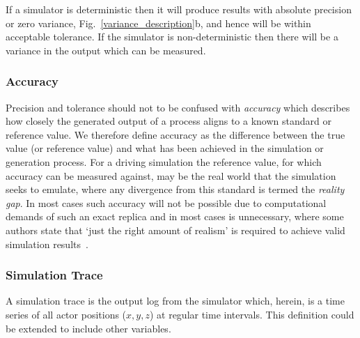 \documentclass[letterpaper, 10 pt, journal, twoside]{IEEEtran}
\begin{document}
If a simulator is deterministic then it will produce results with absolute precision or zero variance, Fig.~\ref{variance_description}b, and hence will be within acceptable tolerance. If the simulator is non-deterministic then there will be a variance in the output which can be measured.\\
%

\subsubsection{Accuracy}
Precision and tolerance should not to be confused with \textit{accuracy} which describes how closely the generated output of a process aligns to a known standard or reference value. We therefore define accuracy as the difference between the true value (or reference value) and what has been achieved in the simulation or generation process. 
%
For a driving simulation the reference value, for which accuracy can be measured against, may be the real world that the simulation seeks to emulate, where any divergence from this standard is termed the \textit{reality gap}. In most cases such accuracy will not be possible due to computational demands of such an exact replica and in most cases is unnecessary, where some authors state that `just the right amount of realism' is required to achieve valid simulation results~\cite{Koopman2018}. \\

\subsubsection{Simulation Trace}
A simulation trace is the output log from the simulator which, herein, is a time series of all actor positions ($x,y,z$) at regular time intervals. This definition could be extended to include other variables.\\%

\end{document}
